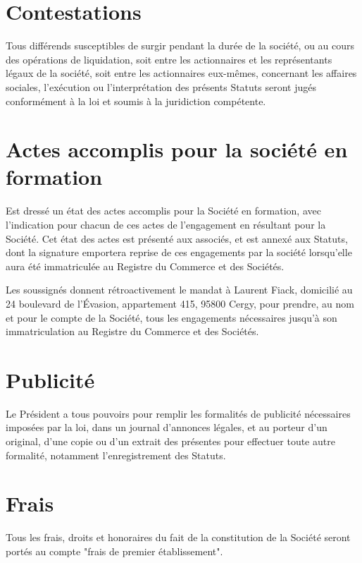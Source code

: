 \documentclass[a4paper,12pt]{report}
\newcommand{\lfAddress}{24 boulevard de l'Évasion, appartement 415, 95800 Cergy}
\begin{document}
\section{Contestations}
Tous différends susceptibles de surgir pendant la durée de la société, ou au cours des opérations de liquidation, soit entre les actionnaires et les représentants légaux de la société, soit entre les actionnaires eux-mêmes, concernant les affaires sociales, l'exécution ou l'interprétation des présents Statuts seront jugés conformément à la loi et soumis à la juridiction compétente.

\section{Actes accomplis pour la société en formation}
Est dressé un état des actes accomplis pour la Société en formation, avec l'indication pour chacun de ces actes de l'engagement en résultant pour la Société. Cet état des actes est présenté aux associés, et est annexé aux Statuts, dont la signature emportera reprise de ces engagements par la société lorsqu'elle aura été immatriculée au Registre du Commerce et des Sociétés.

Les soussignés donnent rétroactivement le mandat à Laurent Fiack, domicilié au \lfAddress, pour prendre, au nom et pour le compte de la Société, tous les engagements nécessaires jusqu'à son immatriculation au Registre du Commerce et des Sociétés.

\section{Publicité}
Le Président a tous pouvoirs pour remplir les formalités de publicité nécessaires imposées par la loi, dans un journal d'annonces légales, et au porteur d'un original, d'une copie ou d'un extrait des présentes pour effectuer toute autre formalité, notamment l'enregistrement des Statuts.

\section{Frais}
Tous les frais, droits et honoraires du fait de la constitution de la Société seront portés au compte "frais de premier établissement".
\end{document}
